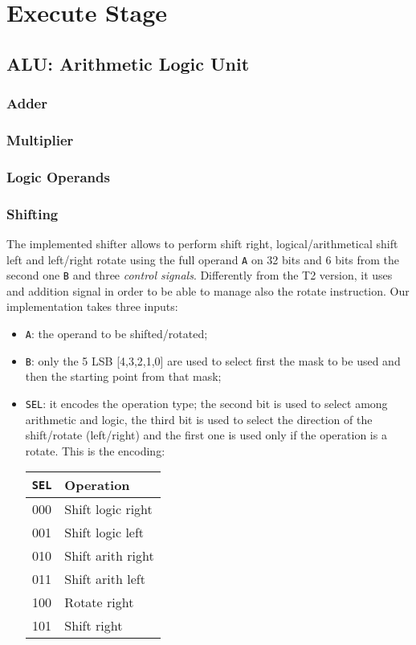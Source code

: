 \chapter{Execute Stage}

\section{ALU: Arithmetic Logic Unit}
\subsection{Adder}
\subsection{Multiplier}
\subsection{Logic Operands}
\subsection{Shifting}
The implemented shifter allows to perform shift right, logical/arithmetical shift left and left/right rotate using the full operand \texttt{A} on 32 bits and 6 bits from the second one \texttt{B} and three \textit{control signals}.
Differently from the T2 version, it uses and addition signal in order to be able to manage also the rotate instruction. Our implementation takes three inputs:
\begin{itemize}
	\itemsep0sp
	\item \texttt{A}: the operand to be shifted/rotated;
	\item \texttt{B}: only the 5 LSB [4,3,2,1,0] are used to select first the mask to be used and then the starting point from that mask;
	\item \texttt{SEL}: it encodes the operation type; the second bit is used to select among arithmetic and logic, the third bit is used to select the direction of the shift/rotate (left/right) and the first one is used only if the operation is a rotate. This is the encoding:
	\begin{center}
		\begin{tabular}{c|l}
			\texttt{SEL} & \textbf{Operation}\\
			\hline
			000 & Shift logic right \\
			001 & Shift logic left \\
			010 & Shift arith right \\
			011 & Shift arith left \\
			100 & Rotate right \\
			101 & Shift right \\
		\end{tabular}
	\end{center}
\end{itemize}

